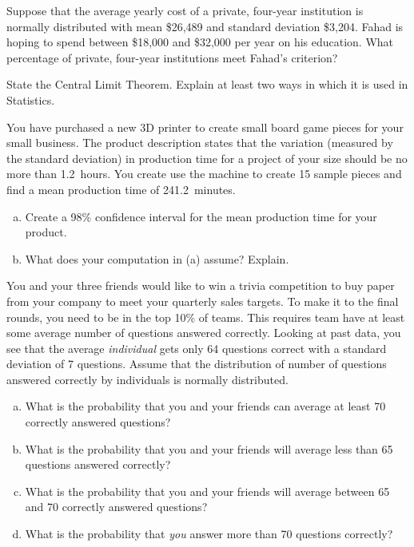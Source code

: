 \documentclass[11pt,letterpaper]{article}
\begin{document}

 Suppose that the average yearly cost of a private, four-year institution is normally distributed with mean \$26,489 and standard deviation \$3,204. Fahad is hoping to spend between \$18,000 and \$32,000 per year on his education. What percentage of private, four-year institutions meet Fahad's criterion? 



\newpage



 State the Central Limit Theorem. Explain at least two ways in which it is used in Statistics. 



\newpage



 You have purchased a new 3D printer to create small board game pieces for your small business. The product description states that the variation (measured by the standard deviation) in production time for a project of your size should be no more than 1.2~hours. You create use the machine to create 15 sample pieces and find a mean production time of 241.2~minutes. 
	\begin{enumerate}[(a)]
	\item Create a 98\% confidence interval for the mean production time for your product. 
	\item What does your computation in (a) assume? Explain. 
	\end{enumerate}



\newpage



 You and your three friends would like to win a trivia competition to buy paper from your company to meet your quarterly sales targets. To make it to the final rounds, you need to be in the top 10\% of teams. This requires team have at least some average number of questions answered correctly. Looking at past data, you see that the average \textit{individual} gets only 64 questions correct with a standard deviation of 7 questions. Assume that the distribution of number of questions answered correctly by individuals is normally distributed. 
	\begin{enumerate}[(a)]
	\item What is the probability that you and your friends can average at least 70 correctly answered questions?
	\item What is the probability that you and your friends will average less than 65 questions answered correctly?
	\item What is the probability that you and your friends will average between 65 and 70 correctly answered questions?
	\item What is the probability that \textit{you} answer more than 70 questions correctly? 
	\end{enumerate}
\end{document}
